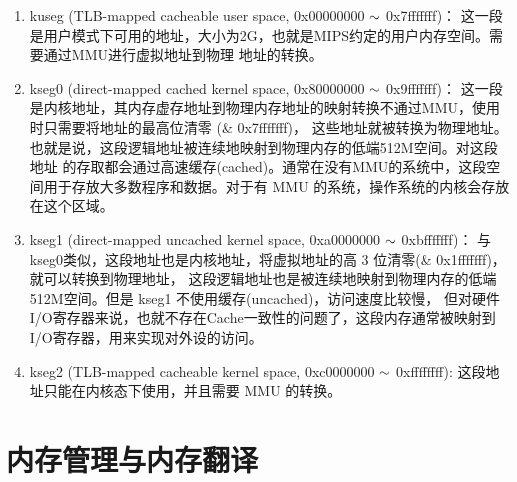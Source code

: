 \begin{enumerate}
  \item kuseg (TLB-mapped cacheable user space, 0x00000000 $\scriptsize{\sim}$ 0x7f\/f\/f\/f\/f\/f\/f)：
  这一段是用户模式下可用的地址，大小为2G，也就是MIPS约定的用户内存空间。需要通过MMU进行虚拟地址到物理
  地址的转换。
  \item kseg0 (direct-mapped cached kernel space, 0x80000000 $\scriptsize{\sim}$ 0x9f\/f\/f\/f\/f\/f\/f)：
  这一段是内核地址，其内存虚存地址到物理内存地址的映射转换不通过MMU，使用时只需要将地址的最高位清零
  (\& 0x7f\/f\/f\/f\/f\/f\/f)，
  这些地址就被转换为物理地址。也就是说，这段逻辑地址被连续地映射到物理内存的低端512M空间。对这段地址
  的存取都会通过高速缓存(cached)。通常在没有MMU的系统中，这段空间用于存放大多数程序和数据。对于有
  MMU 的系统，操作系统的内核会存放在这个区域。
  \item kseg1 (direct-mapped uncached kernel space, 0xa0000000 $\scriptsize{\sim}$ 0xbf\/f\/f\/f\/f\/f\/f)：
  与kseg0类似，这段地址也是内核地址，将虚拟地址的高 3 位清零(\& 0x1f\/f\/f\/f\/f\/f\/f)，就可以转换到物理地址，
  这段逻辑地址也是被连续地映射到物理内存的低端512M空间。但是 kseg1 不使用缓存(uncached)，访问速度比较慢，
  但对硬件I/O寄存器来说，也就不存在Cache一致性的问题了，这段内存通常被映射到I/O寄存器，用来实现对外设的访问。
  \item kseg2 (TLB-mapped cacheable kernel space, 0xc0000000 $\scriptsize{\sim}$ 0xf\/f\/f\/f\/f\/f\/f\/f):
  这段地址只能在内核态下使用，并且需要 MMU 的转换。
\end{enumerate}

\section{内存管理与内存翻译}

